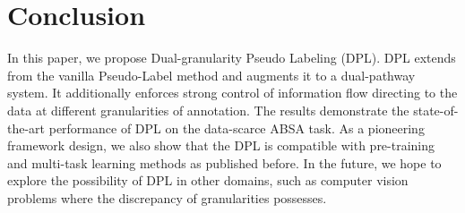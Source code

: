 \documentclass[11pt]{article}
\begin{document}
\section{Conclusion}
In this paper, we propose Dual-granularity Pseudo Labeling (DPL). DPL extends from the vanilla Pseudo-Label method and augments it to a dual-pathway system. It additionally enforces strong control of information flow directing to the data at different granularities of annotation. The results demonstrate the state-of-the-art performance of DPL on the data-scarce ABSA task. As a pioneering framework design, we also show that the DPL is compatible with pre-training and multi-task learning methods as published before. In the future, we hope to explore the possibility of DPL in other domains, such as computer vision problems where the discrepancy of granularities possesses.













































































\end{document}
